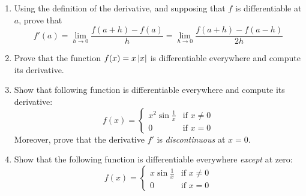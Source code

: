 \begin{exercises}{}
\begin{enumerate}
  \item\label{ex:hderiv} Using the definition of the derivative, and supposing that $f$ is differentiable at $a$, prove that
  \[f'(a)=\lim_{h\to 0}\frac{f(a+h)-f(a)}{h}=\lim_{h\to 0}\frac{f(a+h)-f(a-h)}{2h}\]
  
  
  \item Prove that the function $f(x)=x\left| x\right|$ is differentiable everywhere and compute its derivative.
  
  
  \item\label{exs:diffdiscont} Show that following function is differentiable everywhere and compute its derivative:
  \[f(x)=\begin{cases}
  x^2\sin\frac 1x&\text{if }x\neq 0\\
  0&\text{if }x=0
  \end{cases}\]
  Moreover, prove that the derivative $f'$ is \emph{discontinuous} at $x=0$.
  
  \item\label{ex:diffnonzero} Show that the following function is differentiable everywhere \emph{except} at zero:
  \[f(x)=\begin{cases}
  x\sin\frac 1x&\text{if }x\neq 0\\
  0&\text{if }x=0
  \end{cases}\]
  


\end{enumerate}
\end{exercises}
